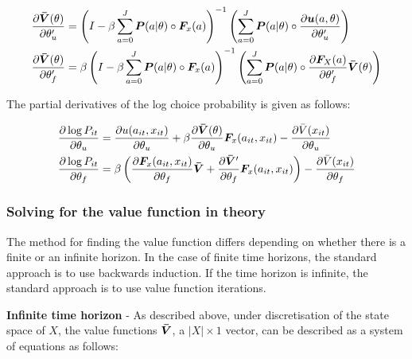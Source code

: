 \documentclass[11pt]{article}
\begin{document}
\begin{align} \label{eq:valfunctionderivs}
    \begin{split}
        \frac{\partial \bm{\Bar{V}}(\theta)}{\partial \theta^\prime_u} &= \left( I - \beta \sum_{a=0}^J \bm{P}(a|\theta) \circ \bm{F}_x(a) \right)^{-1} \left( \sum_{a=0}^J \bm{P}(a|\theta) \circ \frac{\partial \bm{u}(a,\theta)}{\partial \theta_u^\prime} \right) \\
        \frac{\partial \bm{\Bar{V}}(\theta)}{\partial \theta^\prime_f} &= \beta \left( I - \beta \sum_{a=0}^J \bm{P}(a|\theta) \circ \bm{F}_x(a) \right)^{-1} \left( \sum_{a=0}^J \bm{P}(a|\theta) \circ \frac{\partial \bm{F}_X(a)}{\partial \theta_f^\prime}\bm{\Bar{V}}(\theta) \right)
    \end{split}
\end{align}

The partial derivatives of the log choice probability is given as follows:

\begin{align} \label{eq:choiceprobderivs}
    \begin{split}
        \frac{\partial \log P_{it}}{\partial \theta_u} &= \frac{\partial u(a_{it},x_{it})}{\partial \theta_u} + \beta \frac{\partial \bm{\Bar{V}}(\theta)}{\partial \theta_u} \bm{F}_x(a_{it},x_{it}) - \frac{\partial \Bar{V}(x_{it})}{\partial \theta_u}  \\
        \frac{\partial \log P_{it}}{\partial \theta_f} &= \beta \left( \frac{\partial \bm{F}_x(a_{it},x_{it})}{\partial \theta_f}\bm{\Bar{V}} + \frac{\partial \bm{\Bar{V}}^\prime}{\partial \theta_f} \bm{F}_x(a_{it},x_{it}) \right) - \frac{\partial \Bar{V}(x_{it})}{\partial \theta_f}
    \end{split}
\end{align}

\subsubsection{Solving for the value function in theory}

The method for finding the value function differs depending on whether there is a finite or an infinite horizon. In the case of finite time horizons, the standard approach is to use backwards induction. If the time horizon is infinite, the standard approach is to use value function iterations.

\textbf{Infinite time horizon} - As described above, under discretisation of the state space of $X$, the value functions $\bm{\Bar{V}}$, a $|X| \times 1$ vector, can be described as a system of equations as follows:
\end{document}
